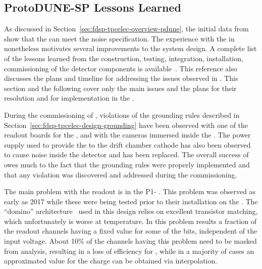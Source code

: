 \subsection{ProtoDUNE-SP Lessons Learned}
\label{sec:fdsp-tpcelec-overview-lessons}

As discussed in Section~\ref{sec:fdsp-tpcelec-overview-pdune}, the initial 
data from  show that the  can meet the noise specification. 
The experience with the  in  nonetheless motivates 
several improvements to the  system design. 
A complete list of the lessons learned from the construction, testing, integration,
installation, commissioning of the  detector components
is available~\cite{bib:docdb12367}. This reference also discusses
the plans and timeline for addressing the issues observed in . 
This  section and the following cover only the main issues 
and the plans for their resolution and for implementation in the . 

During the commissioning of , violations of the
grounding rules described in Section~\ref{sec:fdsp-tpcelec-design-grounding}
have been observed with one of the readout
boards for the , and with the cameras immersed
inside the \lar. The power supply used to provide the  to the 
drift chamber cathode has also been observed
to cause noise inside the detector and has been replaced.
The overall success of  owes much to the fact that the
grounding rules were properly implemented
and that any violation was discovered and addressed during
the commissioning.

The main problem with the   readout is in the
P1- . This problem was observed as early as 2017 
while these  were being tested prior to their installation
on the . The ``domino'' architecture~\cite{dominoADC} used in this design relies on
excellent transistor matching, which unfortunately 
is worse at  temperature. In  this problem
results a fraction of the readout channels having a fixed value for some of
the  bits, independent of the input voltage. About 10\%
of the channels having this problem need to be masked from analysis, 
resulting in a loss of efficiency for , 
while in a majority of cases an approximated value for the charge can
be obtained via interpolation. 

